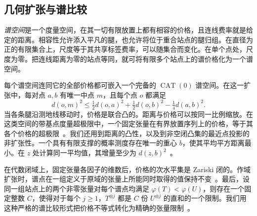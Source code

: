 \subsection{几何扩张与谱比较}

\emph{谱空间}是一个度量空间，在其一切有限放置上都有相容的价格，且连线费率就是给定的距离。相容性允许添入平凡的腿，也允许将位于重合站点的腿归组。在直径为正的有限集合上，尺度等于其共享标签费率，可以随集合而变化。在单个点处，尺度为零。把连线距离为零的站点等同，就可将有限多个站点上的谱价格化为一个谱空间。

每个谱空间连同它的全部价格都可嵌入一个完备的 \(\operatorname{CAT}(0)\) 谱空间。在这一扩张中，每对点 \(a,b\) 有唯一中点 \(m\)，且每个点 \(o\) 都满足
\[
      d(o,m)^2\le \tfrac12 d(o,a)^2+\tfrac12 d(o,b)^2
                                      -\tfrac14 d(a,b)^2 .
\]
当各条腿沿测地线移动时，价格是联合凸的。距离与价格可以按同一比例缩放。在这类空间的带基点度量超极限中，一个固定张量在有界放置序列上的价格，等于其各个价格的超极限~\citep[第~、 节，定理~ 与命题~]{oaG}。我们还用到距离的凸性，以及到非空闭凸集的最近点投影的非扩张性。一个具有有限支撑的概率测度存在唯一的重心 \(b\)，使其平均平方距离最小。在 \(z\) 处计算同一平均值，其增量至少为 \(d(z,b)^2\)~\citep{BridsonHaefliger,oaG}。

在代数闭域上，固定张量各因子的维数后，价格的次水平集是 Zariski 闭的。作域扩张时，谱点在一组定义于原域的张量上所能同时取得的值保持不变~\citep[第~ 节]{oaG}。最后，设同一组站点上的两个非零张量对每个谱点均满足 \(\varphi(T)<\varphi(U)\)，则存在一个固定整数 \(C\)，使得对于每个 \(j\ge1\)，\(T^{\otimes j}\) 都是 \(C\) 份 \(U^{\otimes j}\) 的直和的一个限制。我们用这种严格的谱比较形式把价格不等式转化为精确的张量限制~\citep[引理~]{oaG}。
